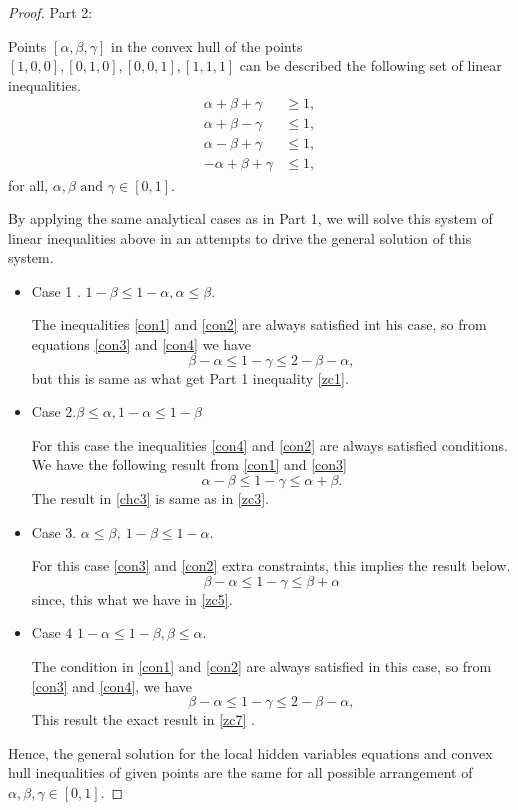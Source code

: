 \begin{proof}
Part 2:

Points $[\alpha,\beta,\gamma]$ in the convex hull of the points $[1, 0, 0], [0, 1, 0], [0, 0, 1], [1, 1, 1]$ can be described the following set of linear inequalities.
\begin{align}
\alpha+\beta+\gamma &\geq 1,\label{con1}\\
\alpha+\beta-\gamma &\leq 1,\label{con2}\\
\alpha-\beta+\gamma &\leq 1,\label{con3}\\
-\alpha+\beta+\gamma &\leq 1\label{con4},
\end{align}
for all, $ \alpha, \beta \text{ and }\gamma \in [0,1]$.

By applying the same analytical cases as in Part 1, we will solve this system of linear  inequalities above in an attempts to drive the general solution of this system.
\begin{itemize}
\item Case 1 . $1-\beta \leq 1-\alpha,\alpha \leq \beta$.

The inequalities \ref{con1} and \ref{con2} are always satisfied int his case, so from equations \ref{con3} and \ref{con4} we have
\begin{equation}
\beta-\alpha \leq 1-\gamma \leq 2-\beta-\alpha, 
\end{equation}
but this is same as what get Part 1  inequality \ref{zc1}.
\item Case 2.$\beta \leq \alpha,1-\alpha \leq 1-\beta$

For this case the inequalities \ref{con4} and \ref{con2} are always satisfied conditions. We have the following result from \ref{con1} and \ref{con3} 
\begin{equation}\label{chc3}
\alpha-\beta \leq 1-\gamma \leq \alpha+\beta.
\end{equation}
The result in \ref{chc3} is same as in \ref{zc3}.

\item  Case 3. $\alpha\leq \beta,\ 1-\beta \leq 1-\alpha$.

For this case  \ref{con3} and \ref{con2} extra constraints, this implies the result below.
\begin{equation}
\beta -\alpha \leq 1-\gamma\leq \beta +\alpha
\end{equation}
since, this what we have in \ref{zc5}.
\item  Case 4  $1-\alpha \leq 1-\beta,\beta  \leq \alpha$.

The condition in \ref{con1} and \ref{con2} are  always satisfied in this case, so from \ref{con3} and \ref{con4}, we have
\begin{equation}
\beta-\alpha \leq 1-\gamma \leq 2-\beta-\alpha, 
\end{equation}
This result the exact result in \ref{zc7} .
\end{itemize}
Hence, the general solution for the local hidden variables equations  and convex hull inequalities of given points are the same for  all possible arrangement of $\alpha, \beta , \gamma \in [0,1]$.
\end{proof}